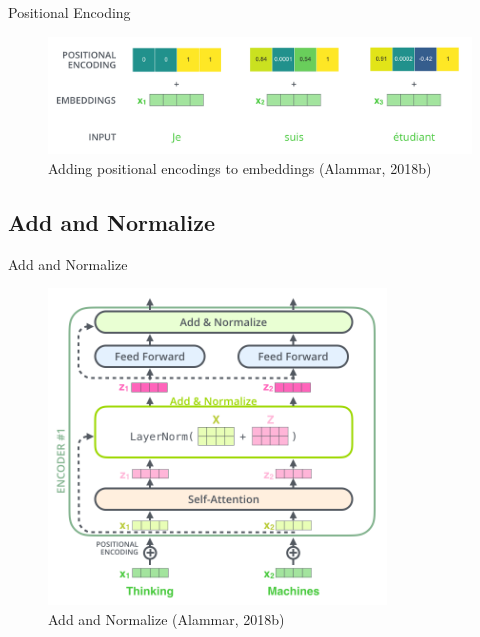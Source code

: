 \documentclass[10pt]{beamer}
\begin{document}
\begin{frame}{Positional Encoding}

\begin{figure}[h]
\centering
\includegraphics[width=1\textwidth]{fig/alammar_transformer_positional_encoding_example.png}
\caption{Adding positional encodings to embeddings (Alammar, 2018b)}
\end{figure}

\end{frame}

\subsection{Add and Normalize}

\begin{frame}{Add and Normalize}

\begin{figure}[h]
\centering
\includegraphics[width=0.8\textwidth]{fig/alammar_transformer_resideual_layer_norm_2.png}
\caption{Add and Normalize (Alammar, 2018b)}
\end{figure}

\end{frame}
\end{document}
